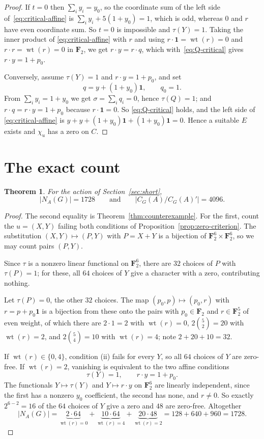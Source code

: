 \documentclass[11pt]{article}
\newtheorem{theorem}{Theorem}[section]
\theoremstyle{definition}
\theoremstyle{remark}
\newcommand{\F}{\mathbf F}
\newcommand{\wt}{\operatorname{wt}}
\newcommand{\one}{\mathbf 1}
\begin{document}
\begin{proof}
If $t=0$ then $\sum_iy_i=y_0$, so the coordinate sum of the left side
of~\eqref{eq:critical-affine} is $\sum_iy_i+5(1+y_0)=1$, which is odd,
whereas $0$ and $r$ have even coordinate sum.  So $t=0$ is impossible
and $\tau(Y)=1$.  Taking the inner product of
\eqref{eq:critical-affine} with $r$ and using
$r\cdot\one=\wt(r)=0$ and $r\cdot r=\wt(r)=0$ in $\F_2$, we get
$r\cdot y=r\cdot q$, which with~\eqref{eq:Q-critical} gives
$r\cdot y=1+p_0$.

Conversely, assume $\tau(Y)=1$ and $r\cdot y=1+p_0$, and set
\[
 q=y+(1+y_0)\one,\qquad q_0=1 .
\]
From $\sum_iy_i=1+y_0$ we get $\sigma=\sum_iq_i=0$, hence
$\tau(Q)=1$; and $r\cdot q=r\cdot y=1+p_0$ because $r\cdot\one=0$.  So
\eqref{eq:Q-critical} holds, and the left side of
\eqref{eq:critical-affine} is $y+y+(1+y_0)\one+(1+y_0)\one=0$.  Hence a
suitable $E$ exists and $\chi_u$ has a zero on $C$.
\end{proof}

\section{The exact count}\label{sec:count}

\begin{theorem}\label{thm:count}
For the action of Section~\ref{sec:short},
\[
 |N_A(G)|=1728
 \qquad\text{and}\qquad
 |C_G(A)/C_G(A)'|=4096 .
\]
\end{theorem}

\begin{proof}
The second equality is Theorem~\ref{thm:counterexample}.  For the
first, count the $u=(X,Y)$ failing both conditions of
Proposition~\ref{prop:zero-criterion}.  The substitution
$(X,Y)\mapsto(P,Y)$ with $P=X+Y$ is a bijection of
$\F_2^6\times\F_2^6$, so we may count pairs $(P,Y)$.

Since $\tau$ is a nonzero linear functional on $\F_2^6$, there are $32$
choices of $P$ with $\tau(P)=1$; for these, all $64$ choices of $Y$
give a character with a zero, contributing nothing.

Let $\tau(P)=0$, the other $32$ choices.  The map
$(p_0,p)\mapsto(p_0,r)$ with $r=p+p_0\one$ is a bijection from these
onto the pairs with $p_0\in\F_2$ and $r\in\F_2^5$ of even weight, of
which there are $2\cdot1=2$ with $\wt(r)=0$, $2\binom52=20$ with
$\wt(r)=2$, and $2\binom54=10$ with $\wt(r)=4$; note $2+20+10=32$.

If $\wt(r)\in\{0,4\}$, condition (ii) fails for every $Y$, so all $64$
choices of $Y$ are zero-free.  If $\wt(r)=2$, vanishing is equivalent
to the two affine conditions
\[
 \tau(Y)=1,\qquad r\cdot y=1+p_0 .
\]
The functionals $Y\mapsto\tau(Y)$ and $Y\mapsto r\cdot y$ on $\F_2^6$
are linearly independent, since the first has a nonzero $y_0$
coefficient, the second has none, and $r\neq0$.  So exactly
$2^{6-2}=16$ of the $64$ choices of $Y$ give a zero and $48$ are
zero-free.  Altogether
\[
 |N_A(G)|=\underbrace{2\cdot64}_{\wt(r)=0}
 +\underbrace{10\cdot64}_{\wt(r)=4}
 +\underbrace{20\cdot48}_{\wt(r)=2}
 =128+640+960=1728 .
\]
\end{proof}
\end{document}
